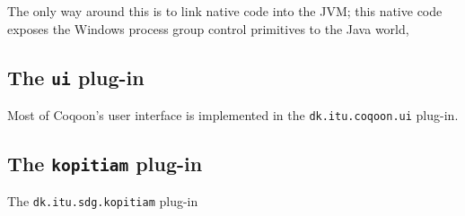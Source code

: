 \documentclass{article}
\begin{document}
The only way around this is to link native code into the JVM; this native code
exposes the Windows process group control primitives to the Java world, 

\subsection{The \texttt{ui} plug-in}

Most of Coqoon's user interface is implemented in the
\texttt{dk.itu.coqoon.ui} plug-in.

\subsection{The \texttt{kopitiam} plug-in}

The \texttt{dk.itu.sdg.kopitiam} plug-in
\end{document}
